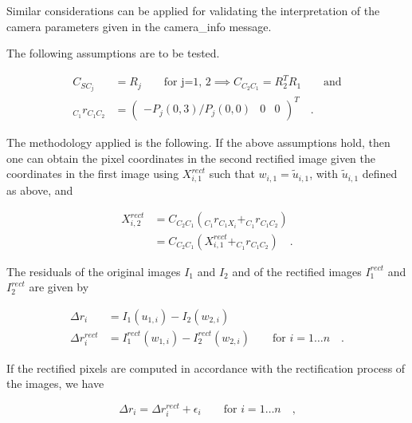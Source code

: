 Similar considerations can be applied for validating the interpretation of the
camera parameters given in the camera\_info message.

The following assumptions are to be tested.

\begin{align}
  C_{SC_j} &= R_j \hspace{2em} \text{for j=1, 2} 
  \implies C_{C_2C_1} = R_2^TR_1 \hspace{2em} \text{and} \\
  _{C_1}r_{C_1C_2} &= \begin{pmatrix} -P_j(0,3)/P_j(0,0) & 0 & 0
  \end{pmatrix}^T
  \hspace{1em}\text{.}
\end{align}

The methodology applied is the following. If the above assumptions hold, then one 
can obtain the pixel coordinates in the second rectified image given the
coordinates in the first image using $X_{i,1}^{rect}$ such that $w_{i,1} = \tilde{u}_{i,1}$, with
$\tilde{u}_{i,1}$ defined as above, and 

\begin{align}
  X_{i,2}^{rect} &= C_{C_2C_1} (_{C_1}r_{C_1X_i} + _{C_1}r_{C_1C_2}) \\
                 &= C_{C_2C_1} (X_{i,1}^{rect} + _{C_1}r_{C_1C_2}) 
  \hspace{1em}\text{.}
  \label{eqn:rect/assumptions}
\end{align}

The residuals of the original images $I_1$ and $I_2$ and of
the rectified images $I_1^{rect}$ and $I_2^{rect}$ are given by

\begin{align}
  \Delta r_i &= I_1(u_{1,i}) - I_2(w_{2,i}) \\
  \Delta r_i^{rect} &= I_1^{rect}(w_{1,i}) - I_2^{rect}(w_{2,i})
  \hspace{2em} \text{for } i = 1 \ldots n 
  \hspace{1em}\text{.}
  \label{eqn:rect/res_def}
\end{align}

If the rectified pixels are computed in accordance with the rectification
process of the images, we have 

\begin{equation}
  \Delta r_i = \Delta r_i^{rect} + \epsilon_i  
  \hspace{2em} \text{for } i = 1 \ldots n
  \hspace{1em}\text{,}
  \label{eqn:rect/res_eq}
\end{equation}

